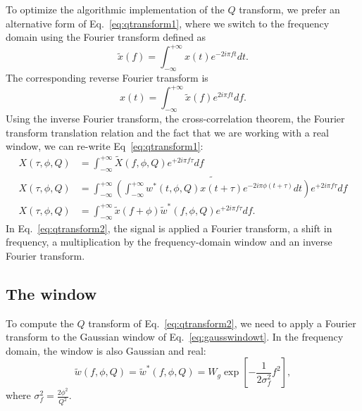 \documentclass[aps]{revtex4-1}
\begin{document}
To optimize the algorithmic implementation of the $Q$ transform, we prefer an alternative form of Eq.~\ref{eq:qtransform1}, where we switch to the frequency domain using the Fourier transform defined as
\begin{equation}
  \tilde{x}(f) = \int_{-\infty}^{+\infty}{ x(t) e^{-2i\pi f t}dt}. \label{eq:FTforward}
\end{equation}
The corresponding reverse Fourier transform is
\begin{equation}
  x(t) = \int_{-\infty}^{+\infty}{ \tilde{x}(f) e^{2i\pi f t}df}.  \label{eq:FTbackward}
\end{equation}
Using the inverse Fourier transform, the cross-correlation theorem, the Fourier transform translation relation and the fact that we are working with a real window, we can re-write Eq~\ref{eq:qtransform1}:
\begin{align}
  X(\tau, \phi, Q) &= \int_{-\infty}^{+\infty}{\tilde{X}(f,\phi,Q) e^{+2i\pi f \tau}df} \\
  X(\tau, \phi, Q) &= \int_{-\infty}^{+\infty}{ \widetilde{\left (\int_{-\infty}^{+\infty}{w^*(t,\phi,Q)x(t+\tau)e^{-2i\pi\phi(t+\tau)}dt}\right)} e^{+2i\pi f \tau}df}\\
  X(\tau, \phi, Q) &= \int_{-\infty}^{+\infty}{ \tilde{x}(f+\phi) \tilde{w}^{*}(f,\phi,Q) e^{+2i\pi f \tau}df}.
  \label{eq:qtransform2}
\end{align}
In Eq.~\ref{eq:qtransform2}, the signal is applied a Fourier transform, a shift in frequency, a multiplication by the frequency-domain window and an inverse Fourier transform.

\subsection{The window} \label{sec:window}
To compute the $Q$ transform of Eq.~\ref{eq:qtransform2}, we need to apply a Fourier transform to the Gaussian window of Eq.~\ref{eq:gausswindowt}. In the frequency domain, the window is also Gaussian and real:
\begin{equation}
  \tilde{w}(f,\phi,Q) = \tilde{w}^*(f,\phi,Q) = W_g\exp\left [ -\frac{1}{2\sigma_f^2}f^2 \right],
  \label{eq:gausswindowf}
\end{equation}
where $\sigma_f^2=\frac{2\phi^2}{Q^2}$.
\end{document}
